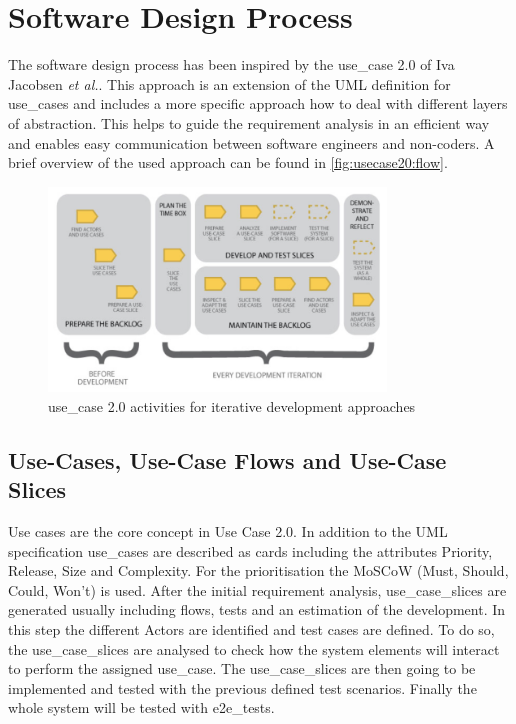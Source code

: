 \section{Software Design Process}
\label{sec:design}

The software design process has been inspired by the \Gls{use_case} 2.0 \cite{jacobson2011usecase} of Iva Jacobsen \textit{et al.}. This approach is an extension of the \gls{UML} definition for \glspl{use_case} and includes a more specific approach how to deal with different layers of abstraction. This helps to guide the requirement analysis in an efficient way and enables easy communication between software engineers and non-coders. A brief overview of the used approach can be found in \autoref{fig:usecase20:flow}.

\begin{figure}[!ht]
\centering
\includegraphics[width=0.8\textwidth]{figures/uc20_flow}
\caption{\Gls{use_case} 2.0 activities for iterative development approaches \cite{jacobson2011usecase}}
\label{fig:usecase20:flow}
\end{figure}


\subsection{Use-Cases, Use-Case Flows and Use-Case Slices}
Use cases are the core concept in Use Case 2.0. In addition to the \gls{UML} specification \glspl{use_case} are described as cards including the attributes Priority, Release, Size and Complexity. For the prioritisation the MoSCoW \cite{moscow} (Must, Should, Could, Won't) is used. After the initial requirement analysis, \glspl{use_case_slice} are generated usually including flows, tests and an estimation of the development. In this step the different \glspl{Actor} are identified and test cases are defined. To do so, the \glspl{use_case_slice} are analysed to check how the system elements will interact to perform the assigned \gls{use_case}. The \glspl{use_case_slice} are then going to be implemented and tested with the previous defined test scenarios. Finally the whole system will be tested with \glspl{e2e_test}.

